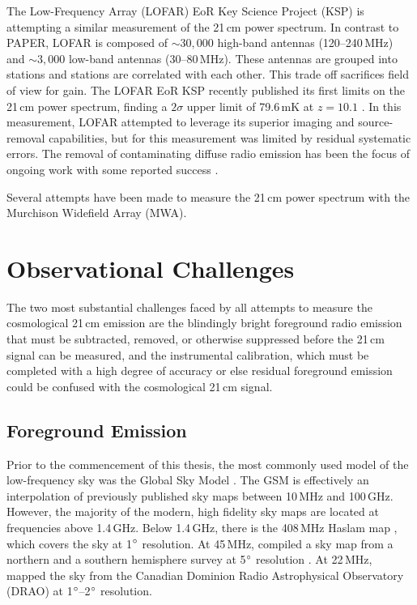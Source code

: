 \begin{bibunit}
The Low-Frequency Array (LOFAR) EoR Key Science Project (KSP) is attempting a similar measurement of
the 21\,cm power spectrum. In contrast to PAPER, LOFAR is composed of $\sim30,000$ high-band
antennas (120--240\,MHz) and $\sim3,000$ low-band antennas (30--80\,MHz). These antennas are grouped
into stations and stations are correlated with each other. This trade off sacrifices field of view
for gain. The LOFAR EoR KSP recently published its first limits on the 21\,cm power spectrum,
finding a $2\sigma$ upper limit of 79.6\,mK at $z=10.1$ \citep{2017ApJ...838...65P}. In this
measurement, LOFAR attempted to leverage its superior imaging and source-removal capabilities, but
for this measurement was limited by residual systematic errors. The removal of contaminating diffuse
radio emission has been the focus of ongoing work with some reported success \citep{koopmans_2017}.

Several attempts have been made to measure the 21\,cm power spectrum with the Murchison Widefield
Array (MWA).



\section{Observational Challenges}

The two most substantial challenges faced by all attempts to measure the cosmological 21\,cm
emission are the blindingly bright foreground radio emission that must be subtracted, removed, or
otherwise suppressed before the 21\,cm signal can be measured, and the instrumental calibration,
which must be completed with a high degree of accuracy or else residual foreground emission could be
confused with the cosmological 21\,cm signal.

\subsection{Foreground Emission}

Prior to the commencement of this thesis, the most commonly used model of the low-frequency sky was
the Global Sky Model \citep[GSM;][]{2008MNRAS.388..247D}. The GSM is effectively an interpolation of
previously published sky maps between 10\,MHz and 100\,GHz. However, the majority of the modern,
high fidelity sky maps are located at frequencies above 1.4\,GHz. Below 1.4\,GHz, there is the
408\,MHz Haslam map \citep{1981A&A...100..209H,1982A&AS...47....1H}, which covers the sky at
1$\mbox{$^\circ$}$ resolution. At 45\,MHz, \citet{2011A&A...525A.138G} compiled a sky map from a northern
and a southern hemisphere survey at 5$\mbox{$^\circ$}$ resolution \citep{1997A&AS..124..315A,
1999A&AS..140..145M}. At 22\,MHz, \citet{1999A&AS..137....7R} mapped the sky from the Canadian
Dominion Radio Astrophysical Observatory (DRAO) at 1$\mbox{$^\circ$}$--2$\mbox{$^\circ$}$ resolution.




\end{bibunit}
